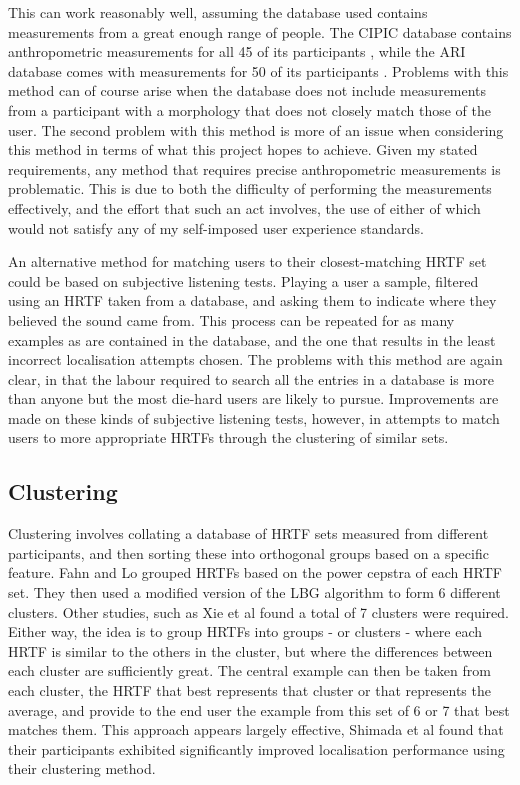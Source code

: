 This can work reasonably well, assuming the database used contains measurements from a great enough range of people. The CIPIC database contains anthropometric measurements for all 45 of its participants \citep{Algazi2001}, while the ARI database comes with measurements for 50 of its participants \citep{AcousticsResearchInstitute}. Problems  with this method can of course arise when the database does not include measurements from a participant with a morphology that does not closely match those of the user. The second problem with this method is more of an issue when considering this method in terms of what this project hopes to achieve. Given my stated requirements, any method that requires precise anthropometric measurements is problematic. This is due to both the difficulty of performing the measurements effectively, and the effort that such an act involves, the use of either of which would not satisfy any of my self-imposed user experience standards.

An alternative method for matching users to their closest-matching HRTF set could be based on subjective listening tests. Playing a user a sample, filtered using an HRTF taken from a database, and asking them to indicate where they believed the sound came from. This process can be repeated for as many examples as are contained in the database, and the one that results in the least incorrect localisation attempts chosen. The problems with this method are again clear, in that the labour required to search all the entries in a database is more than anyone but the most die-hard users are likely to pursue. Improvements are made on these kinds of subjective listening tests, however, in attempts to match users to more appropriate HRTFs through the clustering of similar sets. 

\subsection{Clustering}
Clustering involves collating a database of HRTF sets measured from different participants, and then sorting these into orthogonal groups based on a specific feature. Fahn and Lo \citep{Fahn2003} grouped HRTFs based on the power cepstra of each HRTF set. They then used a modified version of the LBG algorithm to form 6 different clusters. Other studies, such as Xie et al \citep{xie2013a} found a total of 7 clusters were required. Either way, the idea is to group HRTFs into groups - or clusters - where each HRTF is similar to the others in the cluster, but where the differences between each cluster are sufficiently great. The central example can then be taken from each cluster, the HRTF that best represents that cluster or that represents the average, and provide to the end user the example from this set of 6 or 7 that best matches them. This approach appears largely effective, Shimada et al \citep{shimada1994a} found that their participants exhibited significantly improved localisation performance  using their clustering method. 

